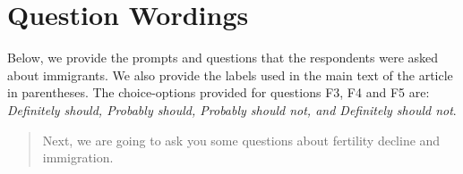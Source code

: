 \documentclass[12pt]{article}
\begin{document}
\clearpage


\newpage



\normalsize{
\singlespacing 

 
}



\clearpage


\newpage



\appendix

\renewcommand{\thesection}{Appendix \Alph{section}}


\section{Question Wordings}

\setcounter{equation}{0}
\renewcommand{\theequation}{A-\arabic{equation}}


Below, we provide the prompts and questions that the respondents were asked about immigrants. We also provide the labels used in the main text of the article in parentheses. The choice-options provided for questions F3, F4 and F5 are: \textit{Definitely should, Probably should, Probably should not, and Definitely should not}.
\begin{quote}
Next, we are going to ask you some questions about fertility decline and immigration.
\end{quote}
\end{document}
